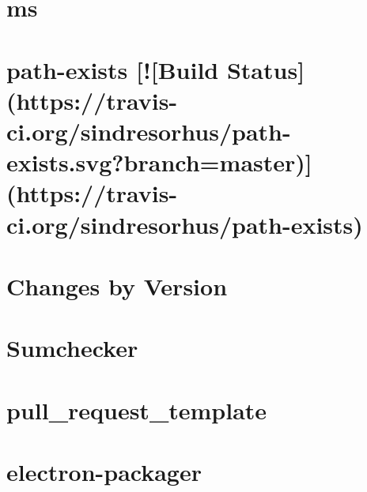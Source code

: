 \documentclass[twoside]{book}
\newcommand{\+}{\discretionary{\mbox{\scriptsize$\hookleftarrow$}}{}{}}
\begin{document}
\chapter{ms}
\label{md_dsmacc_vis_degree_node_modules_electron-packager_node_modules_ms_readme}

\chapter{path-\/exists \mbox{[}!\mbox{[}Build Status\mbox{]}(https\+://travis-\/ci.org/sindresorhus/path-\/exists.svg?branch=master)\mbox{]}(https\+://travis-\/ci.org/sindresorhus/path-\/exists)}
\label{md_dsmacc_vis_degree_node_modules_electron-packager_node_modules_path-exists_readme}

\chapter{Changes by Version}
\label{md_dsmacc_vis_degree_node_modules_electron-packager_node_modules_sumchecker_NEWS}

\chapter{Sumchecker}
\label{md_dsmacc_vis_degree_node_modules_electron-packager_node_modules_sumchecker_README}

\chapter{pull\+\_\+request\+\_\+template}
\label{md_dsmacc_vis_degree_node_modules_electron-packager_pull_request_template}

\chapter{electron-\/packager}
\label{md_dsmacc_vis_degree_node_modules_electron-packager_readme}

\end{document}
